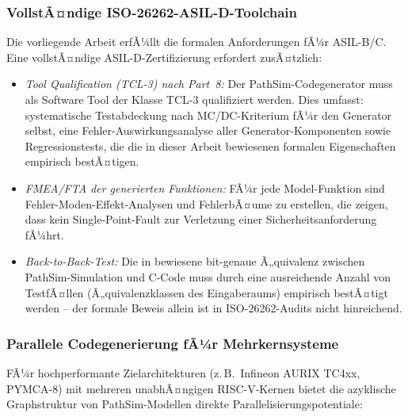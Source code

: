 ﻿\documentclass[12pt,a4paper]{article}
\theoremstyle{definition}
\begin{document}
\subsubsection{VollstÃ¤ndige ISO-26262-ASIL-D-Toolchain}

Die vorliegende Arbeit erfÃ¼llt die formalen Anforderungen fÃ¼r ASIL-B/C.
Eine vollstÃ¤ndige ASIL-D-Zertifizierung erfordert zusÃ¤tzlich:

\begin{itemize}
  \item \emph{Tool Qualification (TCL-3) nach Part~8:} Der PathSim-Codegenerator
        muss als Software Tool der Klasse TCL-3 qualifiziert werden. Dies
        umfasst: systematische Testabdeckung nach MC/DC-Kriterium fÃ¼r
        den Generator selbst, eine Fehler-Auswirkungsanalyse aller
        Generator-Komponenten sowie Regressionstests, die die in dieser
        Arbeit bewiesenen formalen Eigenschaften empirisch bestÃ¤tigen.

  \item \emph{FMEA/FTA der generierten Funktionen:} FÃ¼r jede
        Model-Funktion sind Fehler-Moden-Effekt-Analysen und
        FehlerbÃ¤ume zu erstellen, die zeigen, dass kein Single-Point-Fault
        zur Verletzung einer Sicherheitsanforderung fÃ¼hrt.

  \item \emph{Back-to-Back-Test:} Die in  bewiesene
        bit-genaue Ã„quivalenz zwischen PathSim-Simulation und C-Code muss
        durch eine ausreichende Anzahl von TestfÃ¤llen (Ã„quivalenzklassen
        des Eingaberaums) empirisch bestÃ¤tigt werden -- der formale
        Beweis allein ist in ISO-26262-Audits nicht hinreichend.
\end{itemize}

\subsubsection{Parallele Codegenerierung fÃ¼r Mehrkernsysteme}

FÃ¼r hochperformante Zielarchitekturen (z.\,B.\ Infineon AURIX TC4xx,
PYMCA-8) mit mehreren unabhÃ¤ngigen RISC-V-Kernen bietet die azyklische
Graphstruktur von PathSim-Modellen direkte Parallelisierungspotentiale:
\end{document}

